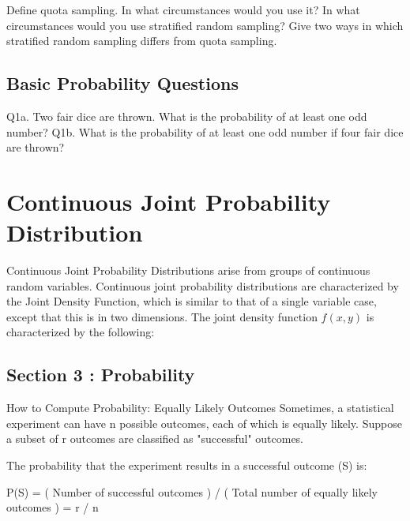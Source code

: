 \documentclass[]{report}
\begin{document}
Define quota sampling. In what circumstances would you use it?
In what circumstances would you use stratified random sampling?
Give two ways in which stratified random sampling differs from quota sampling.

\subsection{Basic Probability Questions}
Q1a.  Two fair dice are thrown. What is the probability of at least one odd number?
Q1b.  What is the probability of at least one odd number if four fair dice are thrown?

%

\section{Continuous Joint Probability Distribution}
Continuous Joint Probability Distributions arise from groups of continuous random variables.
Continuous joint probability distributions are characterized by the Joint Density Function, which is similar to that of a single variable case, except that this is in two dimensions.
The joint density function $f(x,y)$ is characterized by the following:








\subsection*{Section 3 : Probability}

How to Compute Probability: Equally Likely Outcomes
Sometimes, a statistical experiment can have n possible outcomes, each of which is equally likely. Suppose a subset of r outcomes are classified as "successful" outcomes.

The probability that the experiment results in a successful outcome (S) is:

P(S) = ( Number of successful outcomes ) / ( Total number of equally likely outcomes ) = r / n
\end{document}
